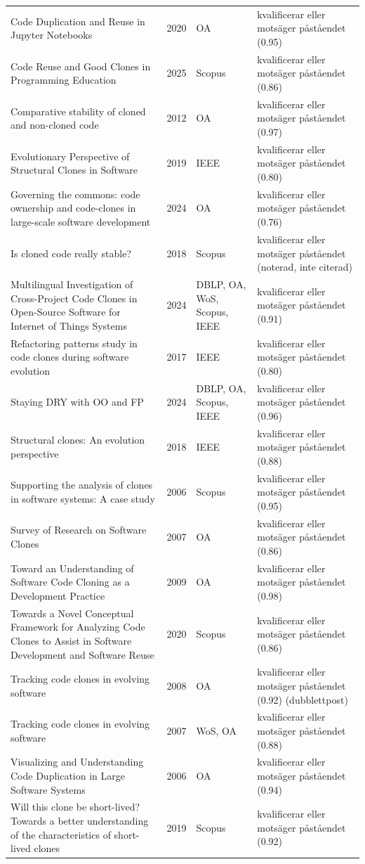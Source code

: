 \begin{longtable}{@{}%
  >{\raggedright\arraybackslash}p{}c%
  >{\raggedright\arraybackslash}p{}%
  >{\raggedright\arraybackslash}p{}@{}}
Code Duplication and Reuse in Jupyter Notebooks & 2020 & OA & kvalificerar eller motsäger påståendet (0.95) \\
Code Reuse and Good Clones in Programming Education & 2025 & Scopus & kvalificerar eller motsäger påståendet (0.86) \\
Comparative stability of cloned and non-cloned code & 2012 & OA & kvalificerar eller motsäger påståendet (0.97) \\
Evolutionary Perspective of Structural Clones in Software & 2019 & IEEE & kvalificerar eller motsäger påståendet (0.80) \\
Governing the commons: code ownership and code-clones in large-scale software development & 2024 & OA & kvalificerar eller motsäger påståendet (0.76) \\
Is cloned code really stable? & 2018 & Scopus & kvalificerar eller motsäger påståendet (noterad, inte citerad) \\
Multilingual Investigation of Cross-Project Code Clones in Open-Source Software for Internet of Things Systems & 2024 & DBLP, OA, WoS, Scopus, IEEE & kvalificerar eller motsäger påståendet (0.91) \\
Refactoring patterns study in code clones during software evolution & 2017 & IEEE & kvalificerar eller motsäger påståendet (0.80) \\
Staying DRY with OO and FP & 2024 & DBLP, OA, Scopus, IEEE & kvalificerar eller motsäger påståendet (0.96) \\
Structural clones: An evolution perspective & 2018 & IEEE & kvalificerar eller motsäger påståendet (0.88) \\
Supporting the analysis of clones in software systems: A case study & 2006 & Scopus & kvalificerar eller motsäger påståendet (0.95) \\
Survey of Research on Software Clones & 2007 & OA & kvalificerar eller motsäger påståendet (0.86) \\
Toward an Understanding of Software Code Cloning as a Development Practice & 2009 & OA & kvalificerar eller motsäger påståendet (0.98) \\
Towards a Novel Conceptual Framework for Analyzing Code Clones to Assist in Software Development and Software Reuse & 2020 & Scopus & kvalificerar eller motsäger påståendet (0.86) \\
Tracking code clones in evolving software & 2008 & OA & kvalificerar eller motsäger påståendet (0.92) (dubblettpost) \\
Tracking code clones in evolving software & 2007 & WoS, OA & kvalificerar eller motsäger påståendet (0.88) \\
Visualizing and Understanding Code Duplication in Large Software Systems & 2006 & OA & kvalificerar eller motsäger påståendet (0.94) \\
Will this clone be short-lived? Towards a better understanding of the characteristics of short-lived clones & 2019 & Scopus & kvalificerar eller motsäger påståendet (0.92) \\
\end{longtable}
\endgroup
